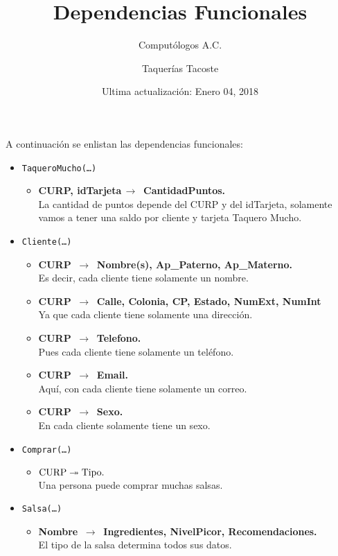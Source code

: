 \documentclass{article}
\title{Dependencias Funcionales}
\author{Computólogos A.C. \and Taquerías Tacoste}
\date{Ultima actualización: Enero 04, 2018}
\newcommand{\flecha}{$\,\to\,$ }
\begin{document}
\maketitle

A continuación se enlistan las dependencias funcionales:

\begin{itemize}

\item \texttt{TaqueroMucho(\ldots)}
	\begin{itemize}
	\item \textbf{CURP, idTarjeta\flecha CantidadPuntos.}\\
		  La cantidad de puntos depende del CURP y del idTarjeta, solamente vamos a tener una saldo por cliente y tarjeta Taquero Mucho.
	\end{itemize}

\item \texttt{Cliente(\ldots)}
	\begin{itemize}
		\item \textbf{CURP \flecha Nombre(s), Ap\_Paterno, Ap\_Materno.}\\
		  Es decir, cada cliente tiene solamente un nombre.		
		\item \textbf{CURP \flecha Calle, Colonia, CP, Estado, NumExt, NumInt}\\
		Ya que cada cliente tiene solamente una dirección.
		\item \textbf{CURP \flecha Telefono.}\\
		Pues cada cliente tiene solamente un teléfono.
		\item \textbf{CURP \flecha Email.}\\
		Aquí, con cada cliente tiene solamente un correo.
		\item \textbf{CURP \flecha Sexo.}\\
		En cada cliente solamente tiene un sexo.	
	\end{itemize}

\item \texttt{Comprar(\ldots)}
	\begin{itemize}
		\item \textbf{$\hbox{CURP} \twoheadrightarrow \hbox{Tipo.}$}\\
		Una persona puede comprar muchas salsas.		
	\end{itemize}

\item \texttt{Salsa(\ldots)}
	\begin{itemize}
		\item \textbf{Nombre \flecha Ingredientes, NivelPicor, Recomendaciones.}\\
		El tipo de la salsa determina todos sus datos.
	\end{itemize}


\end{itemize}
\end{document}
